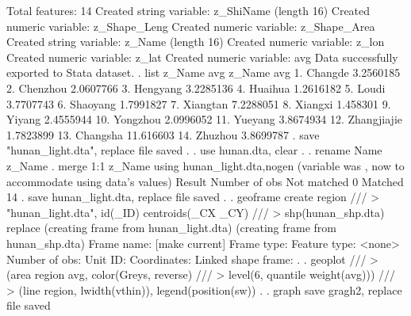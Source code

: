 Total features: 14
Created string variable: z_ShiName (length 16)
Created numeric variable: z_Shape_Leng
Created numeric variable: z_Shape_Area
Created string variable: z_Name (length 16)
Created numeric variable: z_lon
Created numeric variable: z_lat
Created numeric variable: avg
Data successfully exported to Stata dataset.
{\smallskip}
. list z_Name avg
{\smallskip}
     {\TLC}
     {\VBAR}      z_Name         avg {\VBAR}
     {\LFTT}
  1. {\VBAR}     Changde   3.2560185 {\VBAR}
  2. {\VBAR}    Chenzhou   2.0607766 {\VBAR}
  3. {\VBAR}    Hengyang   3.2285136 {\VBAR}
  4. {\VBAR}     Huaihua   1.2616182 {\VBAR}
  5. {\VBAR}       Loudi   3.7707743 {\VBAR}
     {\LFTT}
  6. {\VBAR}    Shaoyang   1.7991827 {\VBAR}
  7. {\VBAR}    Xiangtan   7.2288051 {\VBAR}
  8. {\VBAR}     Xiangxi    1.458301 {\VBAR}
  9. {\VBAR}      Yiyang   2.4555944 {\VBAR}
 10. {\VBAR}    Yongzhou   2.0996052 {\VBAR}
     {\LFTT}
 11. {\VBAR}     Yueyang   3.8674934 {\VBAR}
 12. {\VBAR} Zhangjiajie   1.7823899 {\VBAR}
 13. {\VBAR}    Changsha   11.616603 {\VBAR}
 14. {\VBAR}     Zhuzhou   3.8699787 {\VBAR}
     {\BLC}
{\smallskip}
. save "hunan_light.dta", replace
file{} saved
{\smallskip}
. 
. use hunan.dta, clear
{\smallskip}
. 
. rename Name z_Name  
{\smallskip}
. merge 1:1 z_Name using hunan_light.dta,nogen
(variable {} was {}, now {} to accommodate using data's values)
{\smallskip}
    Result                      Number of obs
    Not matched                             0
    Matched                                14  
{\smallskip}
. save hunan_light.dta, replace
file{} saved
{\smallskip}
. 
. geoframe create region     ///
>          "hunan_light.dta", id(_ID) centroids(_CX _CY) ///
>           shp(hunan_shp.dta) replace
(creating frame {} from hunan_light.dta)
(creating frame {} from hunan_shp.dta)
{\smallskip}
            Frame name: {} [make current]
            Frame type: {}
          Feature type: <none>
         Number of obs: {}
               Unit ID: {}
           Coordinates: {}
    Linked shape frame: {}
{\smallskip}
. 
. geoplot ///
>     (area region avg, color(Greys, reverse) ///
>                 level(6, quantile weight(avg))) ///
>     (line region, lwidth(vthin)), legend(position(sw))
{\smallskip}
.  
. graph save gragh2, replace
file {} saved
{\smallskip}
